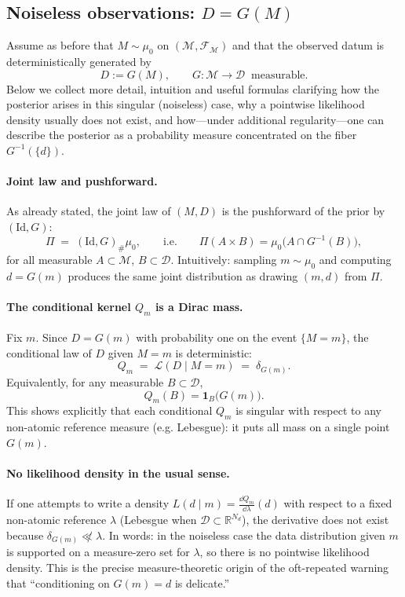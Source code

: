 \documentclass[11pt]{article}
\theoremstyle{remark}
\newcommand{\modelspace}{\mathcal{M}}
\newcommand{\dataspace}{\mathcal{D}}
\begin{document}
\subsection{Noiseless observations: \(D=G(M)\)}
Assume as before that \(M\sim\mu_0\) on \((\modelspace,\mathcal{F}_{\modelspace})\)
and that the observed datum is deterministically generated by
\[
D := G(M),\qquad G:\modelspace\to\dataspace\ \text{ measurable}.
\]
Below we collect more detail, intuition and useful formulas clarifying how the
posterior arises in this singular (noiseless) case, why a pointwise likelihood density
usually does not exist, and how—under additional regularity—one can describe
the posterior as a probability measure concentrated on the fiber \(G^{-1}(\{d\})\).

\paragraph{Joint law and pushforward.}
As already stated, the joint law of \((M,D)\) is the pushforward of the prior by
\((\mathrm{Id},G)\):
\[
\Pi \;=\; (\mathrm{Id},G)_\#\mu_0,
\qquad\text{i.e.}\qquad
\Pi(A\times B) = \mu_0\!\bigl(A\cap G^{-1}(B)\bigr),
\]
for all measurable \(A\subset\modelspace\), \(B\subset\dataspace\).
Intuitively: sampling \(m\sim\mu_0\) and computing \(d=G(m)\) produces the same
joint distribution as drawing \((m,d)\) from \(\Pi\).

\paragraph{The conditional kernel \(Q_m\) is a Dirac mass.}
Fix \(m\). Since \(D=G(m)\) with probability one on the event \(\{M=m\}\),
the conditional law of \(D\) given \(M=m\) is deterministic:
\[
Q_m \;=\; \mathcal{L}(D\mid M=m) \;=\; \delta_{G(m)}.
\]
Equivalently, for any measurable \(B\subset\dataspace\),
\[
Q_m(B) = \mathbf{1}_B\!\bigl(G(m)\bigr).
\]
This shows explicitly that each conditional \(Q_m\) is singular with respect
to any non-atomic reference measure (e.g. Lebesgue): it puts all mass on a single
point \(G(m)\).

\paragraph{No likelihood density in the usual sense.}
If one attempts to write a density \(L(d\mid m)=\frac{\dd Q_m}{\dd\lambda}(d)\)
with respect to a fixed non-atomic reference \(\lambda\) (Lebesgue when
\(\dataspace\subset\mathbb{R}^{N_d}\)), the derivative does not exist because
\(\delta_{G(m)}\not\ll\lambda\). In words: in the noiseless case the data
distribution given \(m\) is supported on a measure-zero set for \(\lambda\), so
there is no pointwise likelihood density. This is the precise measure-theoretic
origin of the oft-repeated warning that ``conditioning on \(G(m)=d\) is delicate.''
\end{document}
